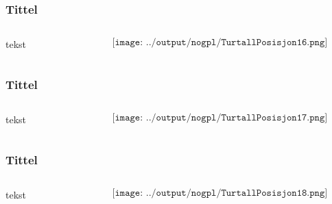 \documentclass[aspectratio=169,xcolor=dvipsnames]{beamer}
\begin{document}
\begin{frame}
	\frametitle{Tittel}
	\begin{columns}
		\begin{column}{0.5\textwidth}
tekst
			
		\end{column}

		\begin{column}{0.5\textwidth}
	$$\texttt{[image: ../output/nogpl/TurtallPosisjon16.png]}$$
		\end{column}
	\end{columns}
\end{frame}
\begin{frame}
	\frametitle{Tittel}
	\begin{columns}
		\begin{column}{0.5\textwidth}
tekst
			
		\end{column}

		\begin{column}{0.5\textwidth}
	$$\texttt{[image: ../output/nogpl/TurtallPosisjon17.png]}$$
		\end{column}
	\end{columns}
\end{frame}
\begin{frame}
	\frametitle{Tittel}
	\begin{columns}
		\begin{column}{0.5\textwidth}
tekst
			
		\end{column}

		\begin{column}{0.5\textwidth}
	$$\texttt{[image: ../output/nogpl/TurtallPosisjon18.png]}$$
		\end{column}
	\end{columns}
\end{frame}
\end{document}
